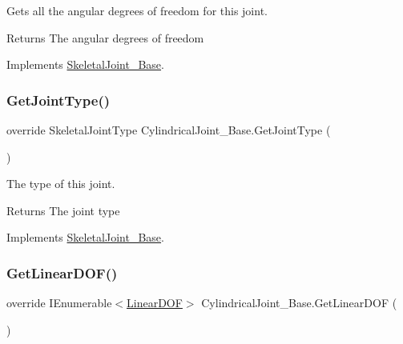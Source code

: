Gets all the angular degrees of freedom for this joint. 

\begin{DoxyReturn}{Returns}
The angular degrees of freedom
\end{DoxyReturn}


Implements \hyperlink{class_skeletal_joint___base_abf96267052733ccf001e0b092c6582f8}{Skeletal\+Joint\+\_\+\+Base}.

\mbox{\label{class_cylindrical_joint___base_a1ee432bc31e0ee98266169233210e621}} 
\subsubsection{\texorpdfstring{Get\+Joint\+Type()}{GetJointType()}}
{\footnotesize\ttfamily override Skeletal\+Joint\+Type Cylindrical\+Joint\+\_\+\+Base.\+Get\+Joint\+Type (\begin{DoxyParamCaption}{ }\end{DoxyParamCaption})\hspace{0.3cm}{\ttfamily [virtual]}}



The type of this joint. 

\begin{DoxyReturn}{Returns}
The joint type
\end{DoxyReturn}


Implements \hyperlink{class_skeletal_joint___base_aee155cbd483cb512bf3fc0f9a8885335}{Skeletal\+Joint\+\_\+\+Base}.

\mbox{\label{class_cylindrical_joint___base_a5e10f664ba08afb2788e2251831c8246}} 
\subsubsection{\texorpdfstring{Get\+Linear\+D\+O\+F()}{GetLinearDOF()}}
{\footnotesize\ttfamily override I\+Enumerable$<$\hyperlink{interface_linear_d_o_f}{Linear\+D\+OF}$>$ Cylindrical\+Joint\+\_\+\+Base.\+Get\+Linear\+D\+OF (\begin{DoxyParamCaption}{ }\end{DoxyParamCaption})\hspace{0.3cm}{\ttfamily [virtual]}}



